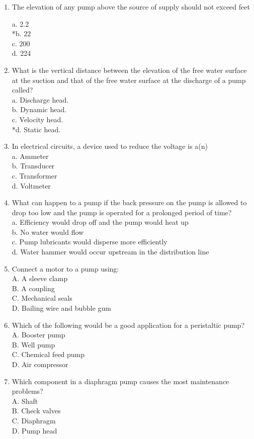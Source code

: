 \begin{enumerate}[1.]
\item  The elevation of any pump above the source of supply should not exceed  {\underline{\hspace{1cm}}} feet

a. 2.2 \\
*b. 22 \\
c. 200 \\
d. 224

\item  What is the vertical distance between the elevation of the free water surface at the suction and that of the free water surface at the discharge of a pump called?\\
a.	Discharge head.\\
b.	Dynamic head.\\
c.	Velocity head.\\
*d.	Static head.\\

\item In electrical circuits, a device used to reduce the voltage is a(n)\\
a. Ammeter\\
b. Transducer\\
c. Transformer\\
d. Voltmeter\\


\item What can happen to a pump if the back pressure on the pump is allowed to drop too low and the pump is operated for a prolonged period of time?\\
a. Efficiency would drop off and the pump would heat up\\
b. No water would flow\\
c. Pump lubricants would disperse more efficiently\\
d. Water hammer would occur upstream in the distribution line\\

\item  Connect a motor to a pump using:\\
A. A sleeve clamp\\
B. A coupling\\
C. Mechanical seals\\
D. Bailing wire and bubble gum\\

\item  Which of the following would be a good application for a peristaltic pump?\\
A. Booster pump\\
B. Well pump\\
C. Chemical feed pump\\
D. Air compressor\\


\item  Which component in a diaphragm pump causes the most maintenance problems?\\
A. Shaft\\
B. Check valves\\
C. Diaphragm\\
D. Pump head\\


\end{enumerate}



